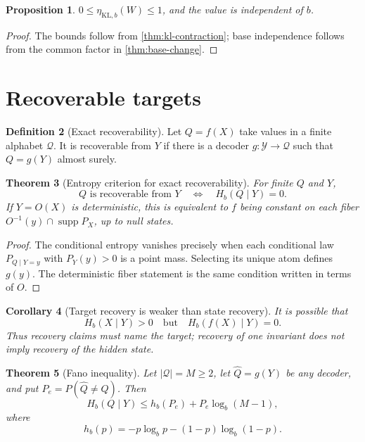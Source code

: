 \documentclass[11pt,a4paper]{article}
\theoremstyle{definition}
\newtheorem{definition}{Definition}[section]
\theoremstyle{plain}
\newtheorem{theorem}[definition]{Theorem}
\newtheorem{proposition}[definition]{Proposition}
\newtheorem{corollary}[definition]{Corollary}
\theoremstyle{remark}
\newcommand{\Y}{\mathcal{Y}}
\newcommand{\Q}{\mathcal{Q}}
\newcommand{\1}{\mathbf{1}}
\newcommand{\supp}{\operatorname{supp}}
\newcommand{\Hb}{H_b}
\newcommand{\hb}{h_b}
\newcommand{\abs}[1]{\left\lvert #1\right\rvert}
\begin{document}
\begin{proposition}
$0\leq\eta_{\mathrm{KL},b}(W)\leq1$, and the value is independent of $b$.
\end{proposition}

\begin{proof}
The bounds follow from \cref{thm:kl-contraction}; base independence follows
from the common factor in \cref{thm:base-change}.
\end{proof}

\section{Recoverable targets}

\begin{definition}[Exact recoverability]
Let $Q=f(X)$ take values in a finite alphabet $\Q$. It is recoverable from
$Y$ if there is a decoder $g:\Y\to\Q$ such that $Q=g(Y)$ almost surely.
\end{definition}

\begin{theorem}[Entropy criterion for exact recoverability]
\label{thm:recovery}
For finite $Q$ and $Y$,
\[
Q\text{ is recoverable from }Y
\quad\Longleftrightarrow\quad
\Hb(Q\mid Y)=0.
\]
If $Y=O(X)$ is deterministic, this is equivalent to $f$ being constant on
each fiber $O^{-1}(y)\cap\supp P_X$, up to null states.
\end{theorem}

\begin{proof}
The conditional entropy vanishes precisely when each conditional law
$P_{Q\mid Y=y}$ with $P_Y(y)>0$ is a point mass. Selecting its unique atom
defines $g(y)$. The deterministic fiber statement is the same condition
written in terms of $O$.
\end{proof}

\begin{corollary}[Target recovery is weaker than state recovery]
It is possible that
\[
\Hb(X\mid Y)>0
\quad\text{but}\quad
\Hb(f(X)\mid Y)=0.
\]
Thus recovery claims must name the target; recovery of one invariant does
not imply recovery of the hidden state.
\end{corollary}

\begin{theorem}[Fano inequality]
\label{thm:fano}
Let $\abs{\Q}=M\geq2$, let $\widehat Q=g(Y)$ be any decoder, and put
$P_e=P(\widehat Q\neq Q)$. Then
\[
\Hb(Q\mid Y)
\leq
\hb(P_e)+P_e\log_b(M-1),
\]
where
\[
\hb(p)=-p\log_b p-(1-p)\log_b(1-p).
\]
\end{theorem}
\end{document}
